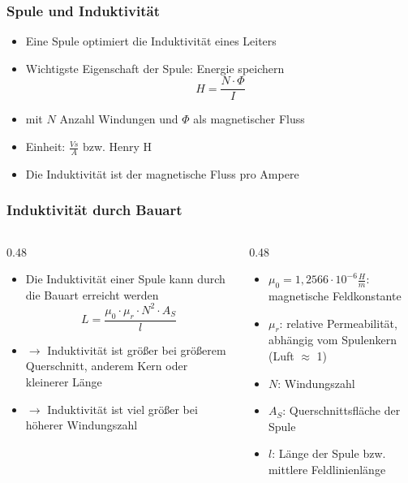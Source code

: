 \begin{frame}
\frametitle{Spule und Induktivität}
\begin{itemize}
  \item Eine Spule optimiert die Induktivität eines Leiters
  \item Wichtigste Eigenschaft der Spule: Energie speichern
    $$H = \dfrac{N\cdot \Phi}{I}$$
  \item mit $N$ Anzahl Windungen und $\Phi$ als magnetischer Fluss
  \item Einheit: $\frac{Vs}{A}$ bzw. Henry $\unit{\henry}$
  \item Die Induktivität ist der magnetische Fluss pro Ampere
  \end{itemize}

\end{frame}

\begin{frame}
\frametitle{Induktivität durch Bauart}
\begin{columns}
    \begin{column}{0.48\textwidth}
    \begin{itemize}
  \item Die Induktivität einer Spule kann durch die Bauart erreicht werden
$$L = \dfrac{\mu_0 \cdot \mu_r \cdot N^2 \cdot A_S}{l}$$
  \item $\rightarrow$ Induktivität ist größer bei größerem Querschnitt, anderem Kern oder kleinerer Länge
  \item $\rightarrow$ Induktivität ist viel größer bei höherer Windungszahl
  \end{itemize}

    \end{column}
   \begin{column}{0.48\textwidth}
       \begin{itemize}
  \item $\mu_0 = 1,2566 \cdot 10^{-6}\frac{H}{m}$: magnetische Feldkonstante
  \item $\mu_r$: relative Permeabilität, abhängig vom Spulenkern (Luft  $\approx$  1)
  \item $N$: Windungszahl
  \item $A_S$: Querschnittsfläche der Spule
  \item $l$: Länge der Spule bzw. mittlere Feldlinienlänge
  \end{itemize}

   \end{column}
\end{columns}

\end{frame}

